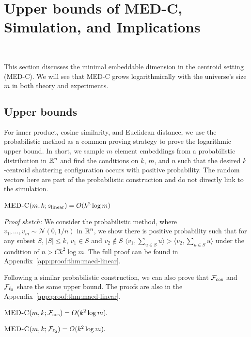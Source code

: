 \documentclass[10pt]{article}
\begin{document}
\section{Upper bounds of MED-C, Simulation, and Implications}~\label{sec:maed_and_exp}

This section discusses the minimal embeddable dimension in the centroid setting (MED-C).
We will see that MED-C grows logarithmically with the universe's size $m$ in both theory and experiments.

\subsection{Upper bounds}

For inner product, cosine similarity, and Euclidean distance, we use the probabilistic method as a common proving strategy to prove the logarithmic upper bound. In short, we sample $m$ element embeddings from a probabilistic distribution in $\mathbb{R}^n$ and find the conditions on $k$, $m$, and $n$ such that the desired $k$-centroid shattering configuration occurs with positive probability. The random vectors here are part of the probabilistic construction and do not directly link to the simulation.

\begin{theorem}\label{thm:medc-linear}
    $\textsc{MED-C}(m, k; s_{\rm linear})=O(k^2\log m)$
\end{theorem}
\noindent\textit{Proof sketch:} We consider the probabilistic method, where $v_1, \dots, v_m \sim \mathcal{N}(0, 1/n)$ in $\mathbb{R}^n$, we show there is positive probability such that for any subset $S$, $|S|\leq k$, $v_1\in S$ and $v_2\notin S$
$ \langle v_1, \sum_{u\in S} u \rangle > \langle v_2 ,  \sum_{u\in S} u \rangle$ under the condition of $n>Ck^2\log m$. The full proof can be found in Appendix~\ref{app:proof:thm:maed-linear}.

Following a similar probabilistic construction, we can also prove that $\mathcal{F}_{\cos}$ and $\mathcal{F}_{\ell_{2}}$ share the same upper bound. The proofs are also in the Appendix~\ref{app:proof:thm:maed-linear}.
\begin{theorem}\label{thm:medc-cos}
$\textsc{MED-C}(m, k; \mathcal{F}_{\cos})=O(k^2\log m).$
\end{theorem}
\begin{theorem}\label{thm:medc-l2}
$\textsc{MED-C}(m, k; \mathcal{F}_{\ell_{2}})=O(k^2\log m).$
\end{theorem}
\end{document}

